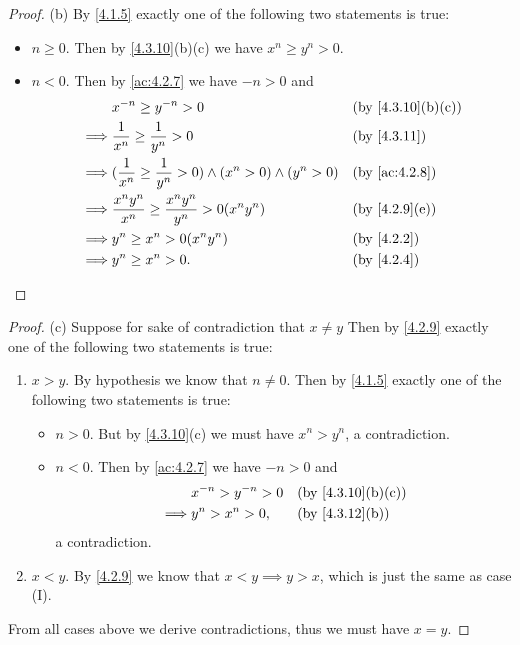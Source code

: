 \begin{proof}{(b)}
  By \cref{4.1.5} exactly one of the following two statements is true:
  \begin{itemize}
    \item \(n \geq 0\).
          Then by \cref{4.3.10}(b)(c) we have \(x^n \geq y^n > 0\).
    \item \(n < 0\).
          Then by \cref{ac:4.2.7} we have \(-n > 0\) and
          \begin{align*}
                     & x^{-n} \geq y^{-n} > 0                                                   &  & \text{(by \cref{4.3.10}(b)(c))} \\
            \implies & \dfrac{1}{x^n} \geq \dfrac{1}{y^n} > 0                                   &  & \by{4.3.11}                     \\
            \implies & (\dfrac{1}{x^n} \geq \dfrac{1}{y^n} > 0) \land (x^n > 0) \land (y^n > 0) &  & \by{ac:4.2.8}                   \\
            \implies & \dfrac{x^n y^n}{x^n} \geq \dfrac{x^n y^n}{y^n} > 0(x^n y^n)              &  & \text{(by \cref{4.2.9}(e))}     \\
            \implies & y^n \geq x^n > 0(x^n y^n)                                                &  & \by{4.2.2}                      \\
            \implies & y^n \geq x^n > 0.                                                        &  & \by{4.2.4}
          \end{align*}
  \end{itemize}
\end{proof}

\begin{proof}{(c)}
  Suppose for sake of contradiction that \(x \neq y\)
  Then by \cref{4.2.9} exactly one of the following two statements is true:
  \begin{enumerate}[label=(\Roman*)]
    \item \(x > y\).
          By hypothesis we know that \(n \neq 0\).
          Then by \cref{4.1.5} exactly one of the following two statements is true:
          \begin{itemize}
            \item \(n > 0\).
                  But by \cref{4.3.10}(c) we must have \(x^n > y^n\), a contradiction.
            \item \(n < 0\).
                  Then by \cref{ac:4.2.7} we have \(-n > 0\) and
                  \begin{align*}
                             & x^{-n} > y^{-n} > 0 &  & \text{(by \cref{4.3.10}(b)(c))} \\
                    \implies & y^n > x^n > 0,      &  & \text{(by \cref{4.3.12}(b))}
                  \end{align*}
                  a contradiction.
          \end{itemize}
    \item \(x < y\).
          By \cref{4.2.9} we know that \(x < y \implies y > x\), which is just the same as case (I).
  \end{enumerate}
  From all cases above we derive contradictions, thus we must have \(x = y\).
\end{proof}

